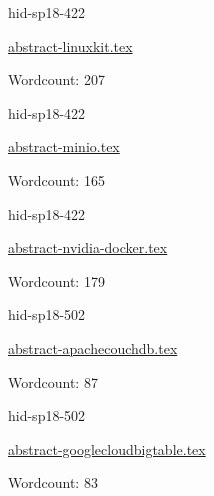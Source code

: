

\begin{IU}

hid-sp18-422

\href{https://github.com/cloudmesh-community/hid-sp18-422/blob/master//technology/abstract-linuxkit.tex}{abstract-linuxkit.tex}

 

Wordcount: 207

\end{IU}



\begin{IU}

hid-sp18-422

\href{https://github.com/cloudmesh-community/hid-sp18-422/blob/master//technology/abstract-minio.tex}{abstract-minio.tex}

 

Wordcount: 165

\end{IU}



\begin{IU}

hid-sp18-422

\href{https://github.com/cloudmesh-community/hid-sp18-422/blob/master//technology/abstract-nvidia-docker.tex}{abstract-nvidia-docker.tex}

 

Wordcount: 179

\end{IU}



\begin{IU}

hid-sp18-502

\href{https://github.com/cloudmesh-community/hid-sp18-502/blob/master//technology/abstract-apachecouchdb.tex}{abstract-apachecouchdb.tex}

 

Wordcount: 87

\end{IU}



\begin{IU}

hid-sp18-502

\href{https://github.com/cloudmesh-community/hid-sp18-502/blob/master//technology/abstract-googlecloudbigtable.tex}{abstract-googlecloudbigtable.tex}

 

Wordcount: 83

\end{IU}

